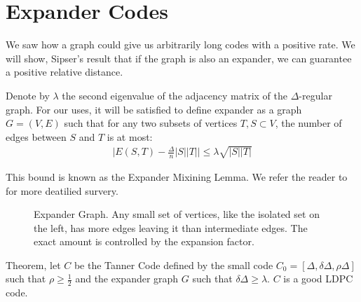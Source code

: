 
  \section{Expander Codes}
  We saw how a graph could give us arbitrarily long codes with a positive rate. We will show, Sipser's result \cite{ExpanderCodes} that if the graph is also an expander, we can guarantee a positive relative distance. 
  \begin{definition} Denote by $\lambda$ the second eigenvalue of the adjacency matrix of the $\Delta$-regular graph. For our uses, it will be satisfied to define expander as a graph $G = \left( V,E \right)$ such that for any two subsets of vertices $T,S \subset V$, the number of edges between $S$ and $T$ is at most:
  \begin{equation*}
    \begin{split}
      \mid E\left( S,T \right) - \frac{\Delta}{n}|S||T| \mid \le \lambda\sqrt{|S| |T|} 
    \end{split}
  \end{equation*}
\end{definition}
This bound is known as the Expander Mixining Lemma. We refer the reader to \cite{hoory2006expander} for more deatilied survery. 
\begin{figure}[H]
  \label{fig:expander}
 
\caption{Expander Graph. Any small set of vertices, like the isolated set on the left, has more edges leaving it than intermediate edges. The exact amount is controlled by the expansion factor.}
\end{figure}
  \begin{theorem*} Theorem, let $C$ be the Tanner Code defined by the small code $C_{0} = [\Delta,\delta\Delta, \rho\Delta ]$ such that $\rho \ge \frac{1}{2}$ and the expander graph $G$ such that $\delta\Delta \ge \lambda$. $C$ is a good  LDPC code.
  \end{theorem*}
